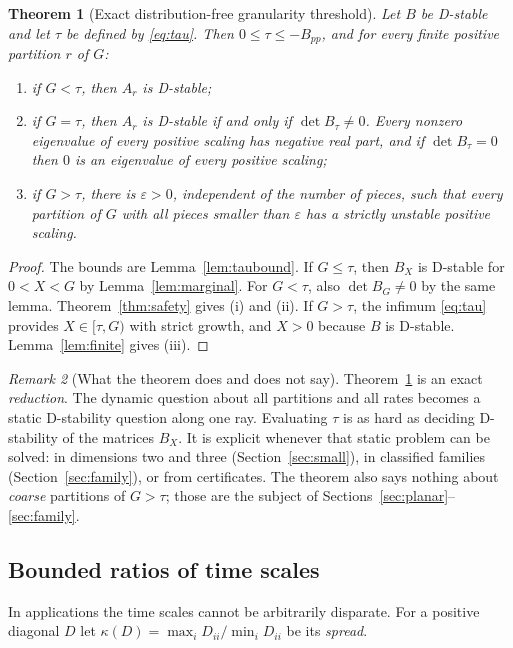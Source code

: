 \documentclass[11pt,a4paper]{article}
\theoremstyle{plain}
\newtheorem{theorem}{Theorem}[section]
\theoremstyle{definition}
\theoremstyle{remark}
\newtheorem{remark}[theorem]{Remark}
\begin{document}
\begin{theorem}[Exact distribution-free granularity threshold]\label{thm:threshold}
Let $B$ be D-stable and let $\tau$ be defined by \eqref{eq:tau}. Then
$0\le\tau\le-B_{pp}$, and for every finite positive partition $r$ of $G$:
\begin{enumerate}[label=(\roman*)]
\item if $G<\tau$, then $A_r$ is D-stable;
\item if $G=\tau$, then $A_r$ is D-stable if and only if $\det B_\tau\ne0$.
Every nonzero eigenvalue of every positive scaling has negative real part, and
if $\det B_\tau=0$ then $0$ is an eigenvalue of every positive scaling;
\item if $G>\tau$, there is $\varepsilon>0$, independent of the number of
pieces, such that every partition of $G$ with all pieces smaller than
$\varepsilon$ has a strictly unstable positive scaling.
\end{enumerate}
\end{theorem}
\begin{proof}
The bounds are Lemma~\ref{lem:taubound}. If $G\le\tau$, then $B_X$ is D-stable
for $0<X<G$ by Lemma~\ref{lem:marginal}. For $G<\tau$, also $\det B_G\ne0$ by
the same lemma. Theorem~\ref{thm:safety} gives (i) and (ii). If $G>\tau$, the
infimum \eqref{eq:tau} provides $X\in[\tau,G)$ with strict growth, and $X>0$
because $B$ is D-stable. Lemma~\ref{lem:finite} gives (iii).
\end{proof}

\begin{remark}[What the theorem does and does not say]\label{rem:reduction}
Theorem~\ref{thm:threshold} is an exact \emph{reduction}. The dynamic question
about all partitions and all rates becomes a static D-stability question along
one ray. Evaluating $\tau$ is as hard as deciding D-stability of the matrices
$B_X$. It is explicit whenever that static problem can be solved: in dimensions
two and three (Section~\ref{sec:small}), in classified families
(Section~\ref{sec:family}), or from certificates. The theorem also says
nothing about \emph{coarse} partitions of $G>\tau$; those are the subject of
Sections~\ref{sec:planar}--\ref{sec:family}.
\end{remark}

\subsection{Bounded ratios of time scales}
In applications the time scales cannot be arbitrarily disparate. For a
positive diagonal $D$ let $\kappa(D)=\max_iD_{ii}/\min_iD_{ii}$ be its
\emph{spread}.
\end{document}
